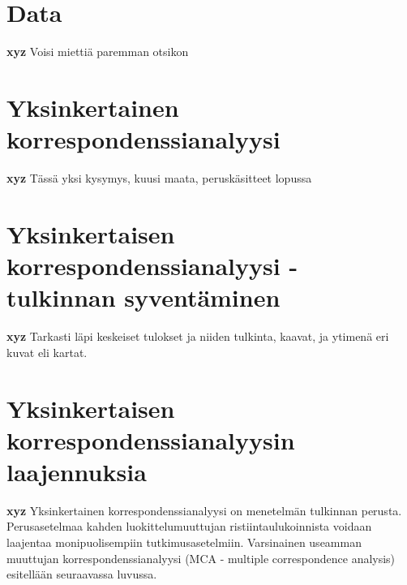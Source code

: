 \documentclass[finnish,]{book}
\begin{document}
\hypertarget{data}{%
\chapter{Data}\label{data}}

\textbf{xyz} Voisi miettiä paremman otsikon

\hypertarget{yksinkertainen-korrespondenssianalyysi}{%
\chapter{Yksinkertainen
korrespondenssianalyysi}\label{yksinkertainen-korrespondenssianalyysi}}

\textbf{xyz} Tässä yksi kysymys, kuusi maata, peruskäsitteet lopussa

\hypertarget{yksinkertaisen-korrespondenssianalyysi---tulkinnan-syventaminen}{%
\chapter{Yksinkertaisen korrespondenssianalyysi - tulkinnan
syventäminen}\label{yksinkertaisen-korrespondenssianalyysi---tulkinnan-syventaminen}}

\textbf{xyz} Tarkasti läpi keskeiset tulokset ja niiden tulkinta,
kaavat, ja ytimenä eri kuvat eli kartat.

\hypertarget{yksinkertaisen-korrespondenssianalyysin-laajennuksia}{%
\chapter{Yksinkertaisen korrespondenssianalyysin
laajennuksia}\label{yksinkertaisen-korrespondenssianalyysin-laajennuksia}}

\textbf{xyz} Yksinkertainen korrespondenssianalyysi on menetelmän
tulkinnan perusta. Perusasetelmaa kahden luokittelumuuttujan
ristiintaulukoinnista voidaan laajentaa monipuolisempiin
tutkimusasetelmiin. Varsinainen useamman muuttujan
korrespondenssianalyysi (MCA - multiple correspondence analysis)
esitellään seuraavassa luvussa.


\end{document}
